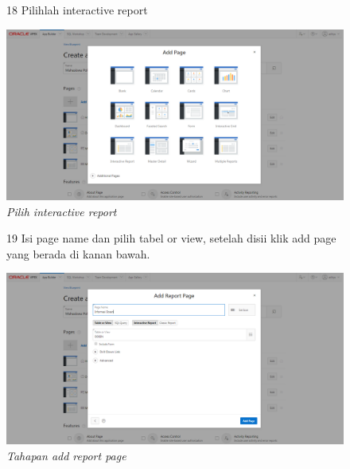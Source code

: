 \begin{enumerate}
\begin{figure}[!htbp]
\item[18] Pilihlah interactive report
	\begin{center}
	\includegraphics[scale=0.2]{figures/tahap20.png}
	\caption{\textit{Pilih interactive report}}
	\end{center}	 
\end{figure}

\begin{figure}[!htbp]
\item[19] Isi page name dan pilih tabel or view, setelah disii klik add page yang berada di kanan bawah. 
	\begin{center}
	\includegraphics[scale=0.2]{figures/tahap21.png}
	\caption{\textit{Tahapan add report page}}
	\end{center}	 
\end{figure}


\end{enumerate}
